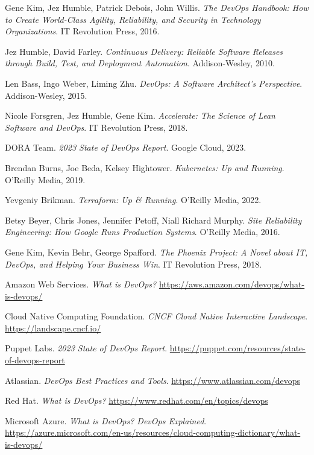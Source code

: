 \documentclass[12pt,a4paper]{article}
\begin{document}
\newpage
\begin{thebibliography}{15}
Gene Kim, Jez Humble, Patrick Debois, John Willis. 
\textit{The DevOps Handbook: How to Create World-Class Agility, Reliability, and Security in Technology Organizations}. IT Revolution Press, 2016.

Jez Humble, David Farley. 
\textit{Continuous Delivery: Reliable Software Releases through Build, Test, and Deployment Automation}. Addison-Wesley, 2010.

Len Bass, Ingo Weber, Liming Zhu. 
\textit{DevOps: A Software Architect's Perspective}. Addison-Wesley, 2015.

Nicole Forsgren, Jez Humble, Gene Kim. 
\textit{Accelerate: The Science of Lean Software and DevOps}. IT Revolution Press, 2018.

DORA Team. 
\textit{2023 State of DevOps Report}. Google Cloud, 2023.

Brendan Burns, Joe Beda, Kelsey Hightower. 
\textit{Kubernetes: Up and Running}. O'Reilly Media, 2019.

Yevgeniy Brikman. 
\textit{Terraform: Up \& Running}. O'Reilly Media, 2022.

Betsy Beyer, Chris Jones, Jennifer Petoff, Niall Richard Murphy. 
\textit{Site Reliability Engineering: How Google Runs Production Systems}. O'Reilly Media, 2016.

Gene Kim, Kevin Behr, George Spafford. 
\textit{The Phoenix Project: A Novel about IT, DevOps, and Helping Your Business Win}. IT Revolution Press, 2018.

Amazon Web Services. 
\textit{What is DevOps?} \url{https://aws.amazon.com/devops/what-is-devops/}

Cloud Native Computing Foundation. 
\textit{CNCF Cloud Native Interactive Landscape}. \url{https://landscape.cncf.io/}

Puppet Labs. 
\textit{2023 State of DevOps Report}. \url{https://puppet.com/resources/state-of-devops-report}

Atlassian. 
\textit{DevOps Best Practices and Tools}. \url{https://www.atlassian.com/devops}

Red Hat. 
\textit{What is DevOps?} \url{https://www.redhat.com/en/topics/devops}

Microsoft Azure. 
\textit{What is DevOps? DevOps Explained}. \url{https://azure.microsoft.com/en-us/resources/cloud-computing-dictionary/what-is-devops/}


\end{thebibliography}
\end{document}
